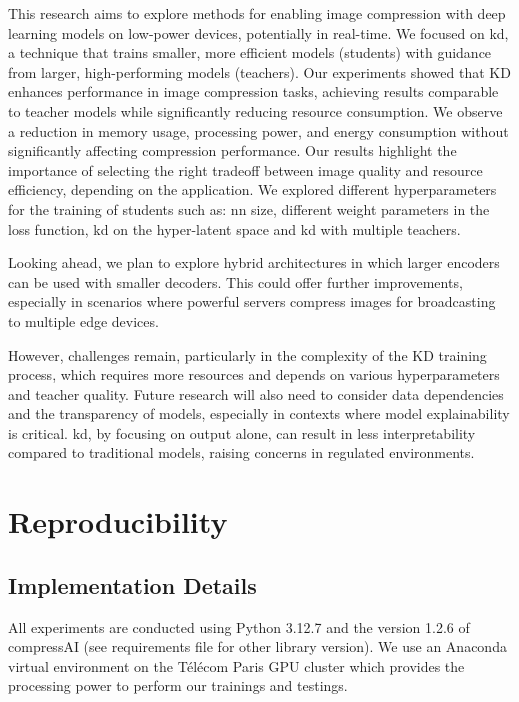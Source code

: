 \documentclass{article}
\begin{document}
This research aims to explore methods for enabling image compression with deep learning models on low-power devices, potentially in real-time. We focused on \acrfull{kd}, a technique that trains smaller, more efficient models (students) with guidance from larger, high-performing models (teachers). Our experiments showed that KD enhances performance in image compression tasks, achieving results comparable to teacher models while significantly reducing resource consumption. We observe a reduction in memory usage, processing power, and energy consumption without significantly affecting compression performance. Our results highlight the importance of selecting the right tradeoff between image quality and resource efficiency, depending on the application. We explored different hyperparameters for the training of students such as: \acrfull{nn} size, different weight parameters in the loss function, \acrshort{kd} on the hyper-latent space and \acrshort{kd} with multiple teachers. 

Looking ahead, we plan to explore hybrid architectures in which larger encoders can be used with smaller decoders. This could offer further improvements, especially in scenarios where powerful servers compress images for broadcasting to multiple edge devices.

However, challenges remain, particularly in the complexity of the KD training process, which requires more resources and depends on various hyperparameters and teacher quality. Future research will also need to consider data dependencies and the transparency of models, especially in contexts where model explainability is critical. \acrlong{kd}, by focusing on output alone, can result in less interpretability compared to traditional models, raising concerns in regulated environments.

\printbibliography

\appendix

\section{Reproducibility}

\subsection{Implementation Details}
All experiments are conducted using Python 3.12.7 and the version 1.2.6 of compressAI (see requirements file for other library version). We use an Anaconda virtual environment on the Télécom Paris GPU cluster which provides the processing power to perform our trainings and testings.
\end{document}
